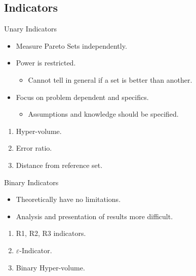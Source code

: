 \documentclass[ignorenonframetext,]{beamer}
\providecommand{\tightlist}{%
  \setlength{\itemsep}{0pt}\setlength{\parskip}{0pt}}
\begin{document}
\subsection{Indicators}\label{indicators}

\begin{frame}{Unary Indicators}

\begin{itemize}
\tightlist
\item
  Measure Pareto Sets independently.
\item
  Power is restricted.

  \begin{itemize}
  \tightlist
  \item
    Cannot tell in general if a set is better than another.
  \end{itemize}
\item
  Focus on problem dependent and specifics.

  \begin{itemize}
  \tightlist
  \item
    Assumptions and knowledge should be specified.
  \end{itemize}
\end{itemize}

\begin{enumerate}
\def\labelenumi{\arabic{enumi}.}
\tightlist
\item
  Hyper-volume.
\item
  Error ratio.
\item
  Distance from reference set.
\end{enumerate}

\end{frame}

\begin{frame}{Binary Indicators}

\begin{itemize}
\tightlist
\item
  Theoretically have no limitations.
\item
  Analysis and presentation of results more difficult.
\end{itemize}

\begin{enumerate}
\def\labelenumi{\arabic{enumi}.}
\tightlist
\item
  R1, R2, R3 indicators.
\item
  \(\varepsilon\)-Indicator.
\item
  Binary Hyper-volume.
\end{enumerate}

\end{frame}
\end{document}
